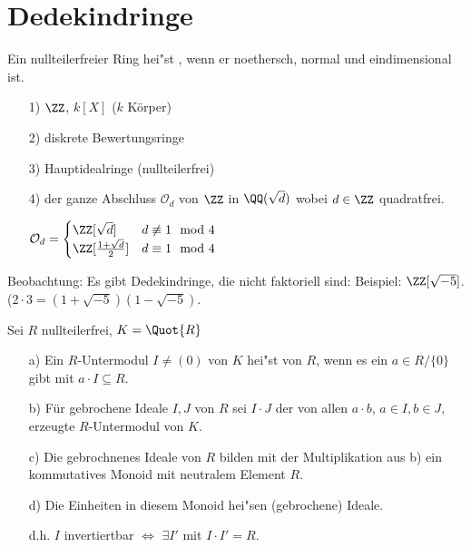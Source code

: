 \section{Dedekindringe}

\begin{Def}

Ein nullteilerfreier Ring hei"st , wenn er noethersch, normal und eindimensional ist.

\begin{nnBsp}
\begin{enumerate}
\item[1)] $\ZZ$, $k[X]$ ($k$ K\"orper)

\item[2)] diskrete Bewertungsringe

\item[3)] Hauptidealringe (nullteilerfrei)

\item[4)] der ganze Abschluss $\mathcal{O}_d$ von $\ZZ$ in $\QQ(\sqrt{d})$ wobei $d \in \ZZ$ quadratfrei.

$\mathcal{O}_d = \begin{cases}
\ZZ[\sqrt{d}] & d \not\equiv 1 \mod 4\\
\ZZ[\frac{1+\sqrt{d}}{2}] & d \equiv 1 \mod 4
\end{cases}$

\end{enumerate}
\end{nnBsp}

\end{Def}

Beobachtung: Es gibt Dedekindringe, die nicht faktoriell sind: Beispiel:
$\ZZ[\sqrt{-5}]$. ($2 \cdot 3 = (1 + \sqrt{-5}) (1 - \sqrt{-5})$.

\begin{DefBem}
Sei $R$ nullteilerfrei, $K = \Quot{R}$
\begin{enumerate}
\item[a)] Ein $R$-Untermodul $I \neq (0)$ von $K$ hei"st  von $R$, wenn es ein $a \in R / \{0\}$ gibt mit $a \cdot I \subseteq R$.

\item[b)] F\"ur gebrochene Ideale $I,J$ von $R$ sei $I \cdot J$ der von allen $a \cdot b$, $a \in I, b \in J$, erzeugte $R$-Untermodul von $K$.

\item[c)] Die gebrochnenes Ideale von $R$ bilden mit der Multiplikation aus b) ein kommutatives Monoid mit neutralem Element $R$.

\item[d)] Die Einheiten in diesem Monoid hei"sen  (gebrochene) Ideale.

d.h. $I$ invertiertbar $\Leftrightarrow$ $\exists I'$ mit $I \cdot I' = R$.

\end{enumerate}
\end{DefBem}

